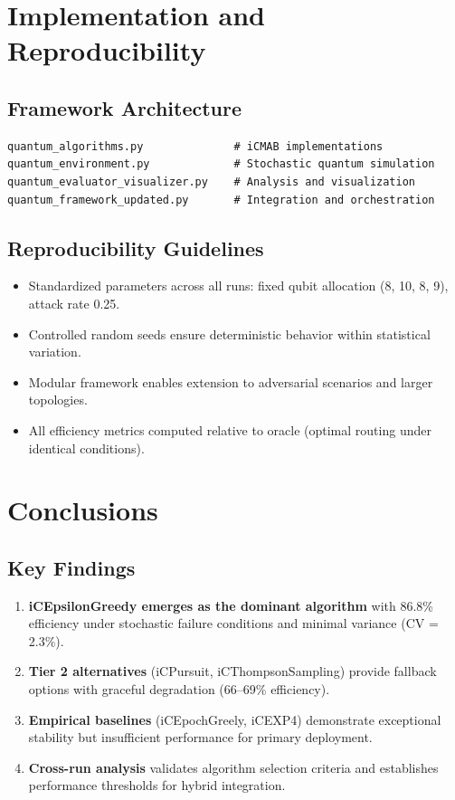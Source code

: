 \documentclass[12pt,a4paper]{article}
\newcommand{\primarytext}[1]{\textcolor{primaryblue}{\textbf{#1}}}
\newcommand{\secondarytext}[1]{\textcolor{secondaryblue}{\textbf{#1}}}
\newcommand{\success}[1]{\textcolor{accentgreen}{\textbf{#1}}}
\begin{document}
\section{Implementation and Reproducibility}

\subsection{Framework Architecture}
\begin{lstlisting}[caption=Core iCMAB Components]
quantum_algorithms.py              # iCMAB implementations
quantum_environment.py             # Stochastic quantum simulation
quantum_evaluator_visualizer.py    # Analysis and visualization
quantum_framework_updated.py       # Integration and orchestration
\end{lstlisting}

\subsection{Reproducibility Guidelines}
\begin{itemize}
\item Standardized parameters across all runs: fixed qubit allocation (8, 10, 8, 9), attack rate 0.25.
\item Controlled random seeds ensure deterministic behavior within statistical variation.
\item Modular framework enables extension to adversarial scenarios and larger topologies.
\item All efficiency metrics computed relative to oracle (optimal routing under identical conditions).
\end{itemize}

\newpage
\section{Conclusions}

\subsection{Key Findings}
\begin{enumerate}
\item \primarytext{iCEpsilonGreedy emerges as the dominant algorithm} with 86.8\% efficiency under stochastic failure conditions and minimal variance (CV = 2.3\%).
\item \secondarytext{Tier 2 alternatives} (iCPursuit, iCThompsonSampling) provide fallback options with graceful degradation (66--69\% efficiency).
\item \success{Empirical baselines} (iCEpochGreely, iCEXP4) demonstrate exceptional stability but insufficient performance for primary deployment.
\item \textbf{Cross-run analysis} validates algorithm selection criteria and establishes performance thresholds for hybrid integration.
\end{enumerate}
\end{document}
